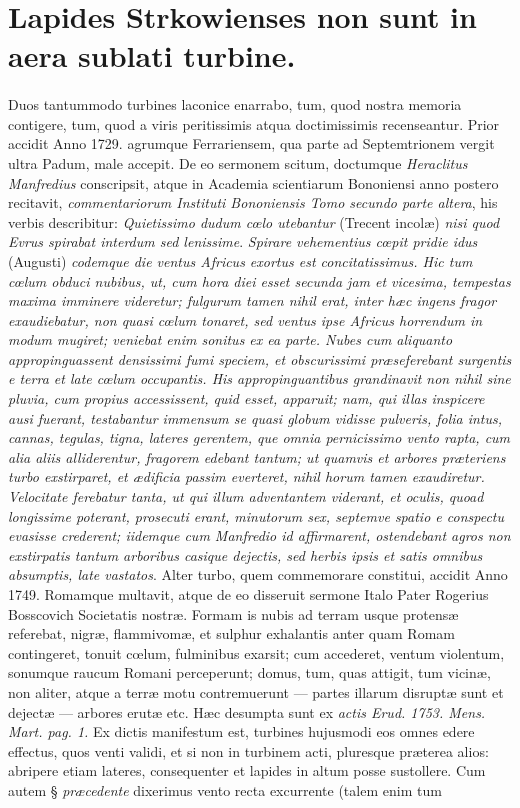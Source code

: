 \documentclass[a4paper, 11pt, oneside, polutonikogreek, latin]{article}
\begin{document}
\section[Lapides Strkowienses non sunt in aera sublati turbine.]{\bfseries{Lapides Strkowienses non sunt in aera sublati turbine.}}
\paragraph{}
Duos tantummodo turbines laconice enarrabo, tum, quod nostra memoria contigere, tum, quod a viris peritissimis atqua doctimissimis recenseantur. Prior accidit Anno 1729. agrumque Ferrariensem, qua parte ad Septemtrionem vergit ultra Padum, male accepit. De eo sermonem scitum, doctumque \emph{Heraclitus Manfredius} conscripsit, atque in Academia scientiarum Bononiensi anno postero recitavit, \emph{commentariorum Instituti Bononiensis Tomo secundo parte altera}, his verbis describitur: \emph{Quietissimo dudum cœlo utebantur} (Trecent incolæ) \emph{nisi quod Evrus spirabat interdum sed lenissime}. \emph{Spirare vehementius cœpit pridie idus} (Augusti) \emph{codemque die ventus Africus exortus est concitatissimus. Hic tum cœlum obduci nubibus, ut, cum hora diei esset secunda jam et vicesima, tempestas maxima imminere videretur; fulgurum tamen nihil erat, inter hæc ingens fragor exaudiebatur, non quasi cœlum tonaret, sed ventus ipse Africus horrendum in modum mugiret; veniebat enim sonitus ex ea parte. Nubes cum aliquanto appropinguassent densissimi fumi speciem, et obscurissimi præseferebant surgentis e terra et late cœlum occupantis. His appropinguantibus grandinavit non nihil sine pluvia, cum propius accessissent, quid esset, apparuit; nam, qui illas inspicere ausi fuerant, testabantur immensum se quasi globum vidisse pulveris, folia intus, cannas, tegulas, tigna, lateres gerentem, que omnia pernicissimo vento rapta, cum alia aliis alliderentur, fragorem edebant tantum; ut quamvis et arbores præteriens turbo exstirparet, et ædificia passim everteret, nihil horum tamen exaudiretur. Velocitate ferebatur tanta, ut qui illum adventantem viderant, et oculis, quoad longissime poterant, prosecuti erant, minutorum sex, septemve spatio e conspectu evasisse crederent; iidemque cum Manfredio id affirmarent, ostendebant agros non exstirpatis tantum arboribus casique dejectis, sed herbis ipsis et satis omnibus absumptis, late vastatos}. Alter turbo, quem commemorare constitui, accidit Anno 1749. Romamque multavit, atque de eo disseruit sermone Italo Pater Rogerius Bosscovich Societatis nostræ. Formam is nubis ad terram usque protensæ referebat, nigræ, flammivomæ, et sulphur exhalantis anter quam Romam contingeret, tonuit cœlum, fulminibus exarsit; cum accederet, ventum violentum, sonumque raucum Romani perceperunt; domus, tum, quas attigit, tum vicinæ, non aliter, atque a terræ motu contremuerunt --- partes illarum disruptæ sunt et dejectæ --- arbores erutæ etc. Hæc desumpta sunt ex \emph{actis Erud. 1753. Mens. Mart. pag. 1.} Ex dictis manifestum est, turbines hujusmodi eos omnes edere effectus, quos venti validi, et si non in turbinem acti, pluresque præterea alios: abripere etiam lateres, consequenter et lapides in altum posse sustollere. Cum autem § \emph{præcedente} dixerimus vento recta excurrente (talem enim tum 
\end{document}
